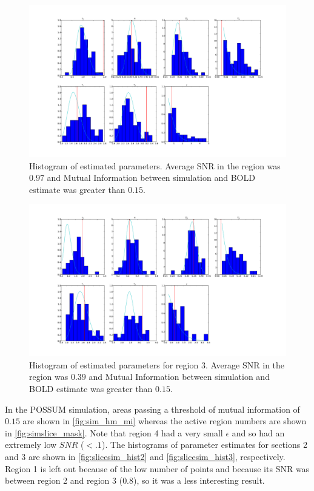 \documentclass[journal]{./IEEEtran}
\begin{document}
\begin{figure}[!t] %
\centering
\includegraphics[clip=true,trim=2.5cm 2cm 2cm 1cm,width=15cm]{sec2hist}
\caption{Histogram of estimated parameters. Average SNR in the region was 
$0.97$ and Mutual Information between simulation and BOLD estimate was greater 
than $0.15$.}
\label{fig:slicesim_hist2}
\end{figure}

\begin{figure}[!t] %
\centering
\includegraphics[clip=true,trim=2.5cm 2cm 2cm 1cm,width=15cm]{sec3hist}
\caption{Histogram of estimated parameters for region 3. Average SNR in the 
region was 
$0.39$ and Mutual Information between simulation and BOLD estimate was greater 
than $0.15$.}
\label{fig:slicesim_hist3}
\end{figure}

In the POSSUM simulation, areas passing a threshold of
mutual information of $0.15$  are shown in 
\autoref{fig:sim_hm_mi}
whereas the active region numbers are shown in 
\autoref{fig:simslice_mask}.
Note that region 4 had a very small $\epsilon$ and so
had an extremely low $SNR$ ($<.1$). The histograms of parameter
estimates for sections
2 and 3 are shown in \autoref{fig:slicesim_hist2} and 
\autoref{fig:slicesim_hist3}, respectively. Region 1 is
left out because of the low number of points and because
its SNR was between region 2 and region 3 ($0.8$), so it
was a less interesting result.
\end{document}
